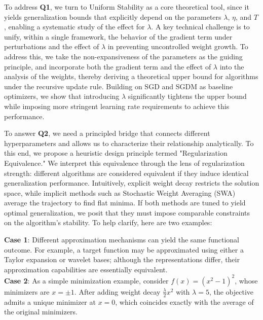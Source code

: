 To address \textbf{Q1}, we turn to Uniform Stability \cite{hardt2016train} as a core theoretical tool, since it yields generalization bounds that explicitly depend on the parameters $\lambda$, $\eta$, and $T$, enabling a systematic study of the effect for $\lambda$. A key technical challenge is to unify, within a single framework, the behavior of the gradient term under perturbations and the effect of $\lambda$ in preventing uncontrolled weight growth. To address this, we take the non-expansiveness of the parameters as the guiding principle, and incorporate both the gradient term and the effect of $\lambda$ into the analysis of the weights, thereby deriving a theoretical upper bound for algorithms under the recursive update rule. Building on SGD and SGDM as baseline optimizers, we show that introducing $\lambda$ significantly tightens the upper bound while imposing more stringent learning rate requirements to achieve this performance.

To answer \textbf{Q2}, we need a principled bridge that connects different hyperparameters and allows us to characterize their relationship analytically. To this end, we propose a heuristic design principle termed "Regularization Equivalence." We interpret this equivalence through the lens of regularization strength: different algorithms are considered equivalent if they induce identical generalization performance. Intuitively, explicit weight decay restricts the solution space, while implicit methods such as Stochastic Weight Averaging (SWA) \cite{izmailov2018averaging} average the trajectory to find flat minima. If both methods are tuned to yield optimal generalization, we posit that they must impose comparable constraints on the algorithm's stability. To help clarify, here are two examples: 

\textbf{Case 1}: Different approximation mechanisms can yield the same functional outcome. For example, a target function may be approximated using either a Taylor expansion or wavelet bases; although the representations differ, their approximation capabilities are essentially equivalent. \\
\textbf{Case 2}: As a simple minimization example, consider $f(x)=(x^2-1)^2$, whose minimizers are $x=\pm 1$. After adding weight decay $\frac{\lambda}{2}x^2$ with $\lambda=5$, the objective admits a unique minimizer at $x=0$, which coincides exactly with the average of the original minimizers. 

